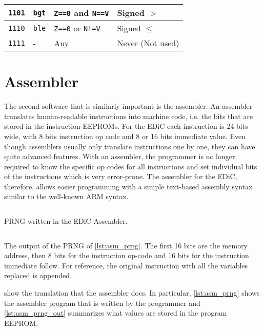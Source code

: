 \begin{table}[t]
\begin{tabularx}{\textwidth}{ |c|l|l|X| }
    \texttt{1101}           & \texttt{bgt}                         & \texttt{Z==0} and \texttt{N==V} & Signed $>$       \\\hline
    \texttt{1110}           & \texttt{ble}                         & \texttt{Z==0} or \texttt{N!=V}  & Signed $\leq$    \\\hline
    \texttt{1111}           & -                                    & Any                             & Never (Not used) \\\hline
  \end{tabularx}
\end{table}

\section{Assembler}\label{sec:assembler}
The second software that is similarly important is the assembler.
An assembler translates human-readable instructions into machine code, i.e. the bits that are stored in the instruction \glspl{EEPROM}.
For the \gls{EDiC} each instruction is 24 bits wide, with 8 bits instruction op code and 8 or 16 bits immediate value.
Even though assemblers usually only translate instructions one by one, they can have quite advanced features.
With an assembler, the programmer is no longer required to know the specific op codes for all instructions and set individual bits of the instructions which is very error-prone.
The assembler for the \gls{EDiC}, therefore, allows easier programming with a simple text-based assembly syntax similar to the well-known ARM syntax.
\begin{listing}[t]
  \inputminted[linenos,
    breaklines,
    frame=leftline,
    xleftmargin=20pt,
  ]{ARM}{src/prng.s}
  \caption{\gls{PRNG} written in the \gls{EDiC} Assembler.}
  \label{lst:asm_prng}
\end{listing}

\begin{listing}[t]
  \inputminted[linenos,
    breaklines,
    frame=leftline,
    xleftmargin=20pt,
  ]{ARM}{src/prng_out.s}
  \caption{The output of the \gls{PRNG} of \cref{lst:asm_prng}. The first 16 bits are the memory address, then 8 bits for the instruction op-code and 16 bits for the instruction immediate follow. For reference, the original instruction with all the variables replaced is appended.}
  \label{lst:asm_prng_out}
\end{listing}

 show the translation that the assembler does.
In particular, \cref{lst:asm_prng} shows the assembler program that is written by the programmer and \cref{lst:asm_prng_out} summarizes what values are stored in the program \gls{EEPROM}.

